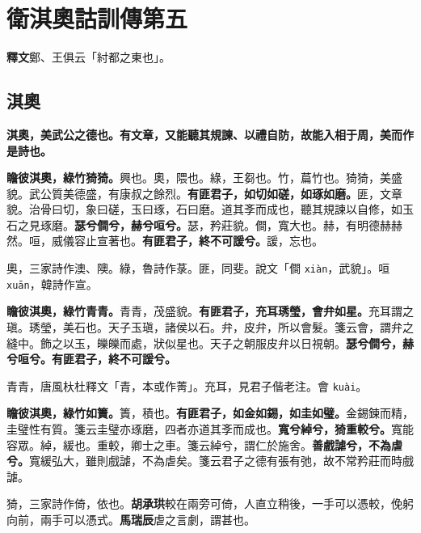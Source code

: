\chapter{衛淇奧詁訓傳第五}

\begin{quoting}\textbf{釋文}鄭、王俱云「紂都之東也」。\end{quoting}

\section{淇奧}


\textbf{淇奧，美武公之德也。有文章，又能聽其規諫、以禮自防，故能入相于周，美而作是詩也。}

\textbf{瞻彼淇奧，綠竹猗猗。}{\footnotesize 興也。奧，隈也。綠，王芻也。竹，萹竹也。猗猗，美盛貌。武公質美德盛，有康叔之餘烈。}\textbf{有匪君子，如切如磋，如琢如磨。}{\footnotesize 匪，文章貌。治骨曰切，象曰磋，玉曰琢，石曰磨。道其斈而成也，聽其規諫以自修，如玉石之見琢磨。}\textbf{瑟兮僴兮，赫兮咺兮。}{\footnotesize 瑟，矜莊貌。僴，寬大也。赫，有明德赫赫然。咺，威儀容止宣著也。}\textbf{有匪君子，終不可諼兮。}{\footnotesize 諼，忘也。}

\begin{quoting}奧，三家詩作澳、隩。綠，魯詩作菉。匪，同斐。說文「僴 \texttt{xiàn}，武貌」。咺 \texttt{xuān}，韓詩作宣。\end{quoting}

\textbf{瞻彼淇奧，綠竹青青。}{\footnotesize 青青，茂盛貌。}\textbf{有匪君子，充耳琇瑩，會弁如星。}{\footnotesize 充耳謂之瑱。琇瑩，美石也。天子玉瑱，諸侯以石。弁，皮弁，所以會髮。箋云會，謂弁之縫中。飾之以玉，皪皪而處，狀似星也。天子之朝服皮弁以日視朝。}\textbf{瑟兮僴兮，赫兮咺兮。有匪君子，終不可諼兮。}

\begin{quoting}青青，唐風杕杜釋文「青，本或作菁」。充耳，見君子偕老注。會 \texttt{kuài}。\end{quoting}

\textbf{瞻彼淇奧，綠竹如簀。}{\footnotesize 簀，積也。}\textbf{有匪君子，如金如錫，如圭如璧。}{\footnotesize 金錫鍊而精，圭璧性有質。箋云圭璧亦琢磨，四者亦道其斈而成也。}\textbf{寬兮綽兮，猗重較兮。}{\footnotesize 寬能容眾。綽，緩也。重較，卿士之車。箋云綽兮，謂仁於施舍。}\textbf{善戲謔兮，不為虐兮。}{\footnotesize 寬緩弘大，雖則戲謔，不為虐矣。箋云君子之德有張有弛，故不常矜莊而時戲謔。}

\begin{quoting}猗，三家詩作倚，依也。\textbf{胡承珙}較在兩旁可倚，人直立稍後，一手可以憑較，俛躬向前，兩手可以憑式。\textbf{馬瑞辰}虐之言劇，謂甚也。\end{quoting}

